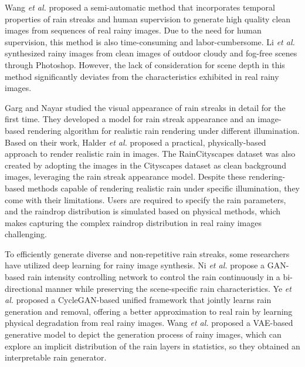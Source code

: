 Wang \MakeLowercase{\textit{et al.}} \cite{wang2019spatial} proposed a semi-automatic method that incorporates temporal properties of rain streaks and human supervision to generate high quality clean images from sequences of real rainy images. Due to the need for human supervision, this method is also time-consuming and labor-cumbersome. Li \MakeLowercase{\textit{et al.}} \cite{li2019single} synthesized rainy images from clean images of outdoor cloudy and fog-free scenes through Photoshop. However, the lack of consideration for scene depth in this method significantly deviates from the characteristics exhibited in real rainy images.

Garg and Nayar \cite{garg2006photorealistic} studied the visual appearance of rain streaks in detail for the first time. They developed a model for rain streak appearance and an image-based rendering algorithm for realistic rain rendering under different illumination. Based on their work, Halder \MakeLowercase{\textit{et al.}} \cite{halder2019physics} proposed a practical, physically-based approach to render realistic rain in images. The RainCityscapes \cite{hu2019depth} dataset was also created by adopting the images in the Cityscapes \cite{cordts2016cityscapes} dataset as clean background images, leveraging the rain streak appearance model. Despite these rendering-based methods capable of rendering realistic rain under specific illumination, they come with their limitations. Users are required to specify the rain parameters, and the raindrop distribution is simulated based on physical methods, which makes capturing the complex raindrop distribution in real rainy images challenging.

To efficiently generate diverse and non-repetitive rain streaks, some researchers have utilized deep learning for rainy image synthesis. Ni \MakeLowercase{\textit{et al.}} \cite{ni2021controlling} propose a GAN-based \cite{goodfellow2020generative} rain intensity controlling network to control the rain continuously in a bi-directional manner while preserving the scene-specific rain characteristics. Ye \MakeLowercase{\textit{et al.}} \cite{ye2021closing} proposed a CycleGAN-based \cite{zhu2017unpaired} unified framework that jointly learns rain generation and removal, offering a better approximation to real rain by learning physical degradation from real rainy images. Wang \MakeLowercase{\textit{et al.}} \cite{wang2021rain} proposed a VAE-based \cite{kingma2013auto} generative model to depict the generation process of rainy images, which can explore an implicit distribution of the rain layers in statistics, so they obtained an interpretable rain generator.

